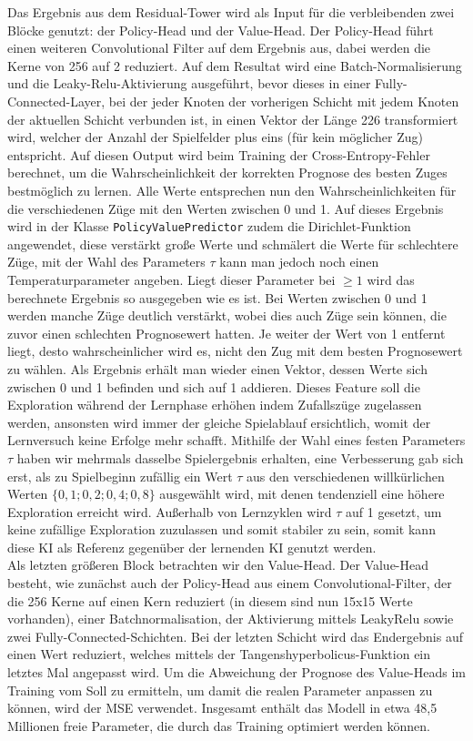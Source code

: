 \documentclass[12pt,a4paper]{article}
\begin{document}
Das Ergebnis aus dem Residual-Tower wird als Input für die verbleibenden zwei Blöcke genutzt: der Policy-Head und der Value-Head. Der Policy-Head führt einen weiteren Convolutional Filter auf dem Ergebnis aus, dabei werden die Kerne von 256 auf 2 reduziert. Auf dem Resultat  wird eine Batch-Normalisierung und die Leaky-Relu-Aktivierung ausgeführt, bevor dieses in einer Fully-Connected-Layer, bei der jeder Knoten der vorherigen Schicht mit jedem Knoten der aktuellen Schicht verbunden ist, in einen Vektor der Länge 226 transformiert wird, welcher der Anzahl der Spielfelder plus eins (für kein möglicher Zug) entspricht. Auf diesen Output wird beim Training der Cross-Entropy-Fehler berechnet, um die Wahrscheinlichkeit der korrekten Prognose des besten Zuges bestmöglich zu lernen. Alle Werte entsprechen nun den Wahrscheinlichkeiten für die verschiedenen Züge mit den Werten zwischen 0 und 1. Auf dieses Ergebnis wird in der Klasse \texttt{PolicyValuePredictor} zudem die Dirichlet-Funktion angewendet, diese verstärkt große Werte und schmälert die Werte für schlechtere Züge, mit der Wahl des Parameters $\tau$ kann man jedoch noch einen Temperaturparameter angeben. Liegt dieser Parameter bei $\geq 1$ wird das berechnete Ergebnis so ausgegeben wie es ist. Bei Werten zwischen 0 und 1 werden manche Züge deutlich verstärkt, wobei dies auch Züge sein können, die zuvor einen schlechten Prognosewert hatten. Je weiter der Wert von 1 entfernt liegt, desto wahrscheinlicher wird es, nicht den Zug mit dem besten Prognosewert zu wählen. Als Ergebnis erhält man wieder einen Vektor, dessen Werte sich zwischen 0 und 1 befinden und sich auf 1 addieren. Dieses Feature soll die Exploration während der Lernphase erhöhen indem Zufallszüge zugelassen werden, ansonsten wird immer der gleiche Spielablauf ersichtlich, womit der Lernversuch keine Erfolge mehr schafft. Mithilfe der Wahl eines festen Parameters $\tau$ haben wir mehrmals dasselbe Spielergebnis erhalten, eine Verbesserung gab sich erst, als zu Spielbeginn zufällig ein Wert  $\tau$ aus den verschiedenen willkürlichen Werten $\{0,1; 0,2; 0,4; 0,8\}$ ausgewählt wird, mit denen tendenziell eine höhere Exploration erreicht wird. Außerhalb von Lernzyklen wird $\tau$ auf 1 gesetzt, um keine zufällige Exploration zuzulassen und somit stabiler zu sein, somit kann diese KI als Referenz gegenüber der lernenden KI genutzt werden. \\
Als letzten größeren Block betrachten wir den Value-Head. Der Value-Head besteht, wie zunächst auch der Policy-Head aus einem Convolutional-Filter, der die 256 Kerne auf einen Kern reduziert (in diesem sind nun 15x15 Werte vorhanden), einer Batchnormalisation, der Aktivierung mittels LeakyRelu sowie zwei Fully-Connected-Schichten. Bei der letzten Schicht wird das Endergebnis auf einen Wert reduziert, welches mittels der Tangenshyperbolicus-Funktion ein letztes Mal angepasst wird. Um die Abweichung der Prognose des Value-Heads im Training vom Soll zu ermitteln, um damit die realen Parameter anpassen zu können, wird der MSE verwendet. Insgesamt enthält das Modell in etwa 48,5 Millionen freie Parameter, die durch das Training optimiert werden können.
\end{document}
